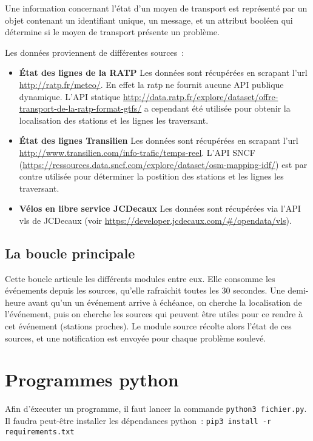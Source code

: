 \documentclass[a4paper, 8pt]{article}
\begin{document}
Une information concernant l'état d'un moyen de transport est représenté par un
objet contenant un identifiant unique, un message, et un attribut booléen qui
détermine si le moyen de transport présente un problème.

Les données proviennent de différentes sources~:
\begin{itemize}
  \item \textbf{État des lignes de la RATP} Les données sont récupérées en scrapant l'url
  \url{http://ratp.fr/meteo/}.
  En effet la ratp ne fournit aucune API publique dynamique.
  L'API statique
  \url{http://data.ratp.fr/explore/dataset/offre-transport-de-la-ratp-format-gtfs/}
  a cependant été utilisée pour obtenir la localisation des stations et les lignes
  les traversant.

  \item \textbf{État des lignes Transilien} Les données sont récupérées en scrapant l'url \url{http://www.transilien.com/info-trafic/temps-reel}.
  L'API SNCF (\url{https://ressources.data.sncf.com/explore/dataset/osm-mapping-idf/})
  est par contre utilisée pour déterminer la postition des stations et les
  lignes les traversant.

  \item \textbf{Vélos en libre service JCDecaux} Les données sont récupérées via
  l'API vls de JCDecaux (voir \url{https://developer.jcdecaux.com/#/opendata/vls}).
\end{itemize}

\subsection{La boucle principale}

Cette boucle articule les différents modules entre eux.
Elle consomme les événements depuis les sources, qu'elle rafraichit toutes les
$30$ secondes.
Une demi-heure avant qu'un un événement arrive à échéance, on cherche la
localisation de l'événement, puis on cherche les sources qui peuvent être utiles
pour ce rendre à cet événement (stations proches).
Le module source récolte alors l'état de ces sources, et une notification est
envoyée pour chaque problème soulevé.


\section{Programmes python}

Afin d'éxecuter un programme, il faut lancer la commande
\texttt{python3 fichier.py}.
Il faudra peut-être installer les dépendances python~:
\texttt{pip3 install -r requirements.txt}
\end{document}
